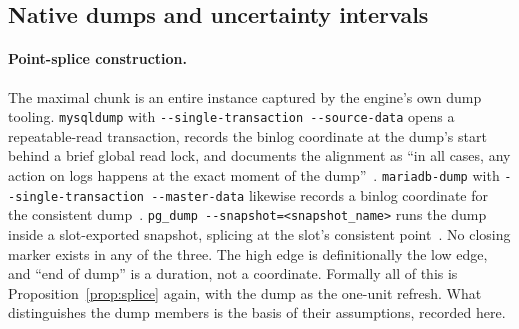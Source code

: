 \documentclass[sigconf,nonacm,10pt]{acmart}
\theoremstyle{plain}
\theoremstyle{definition}
\begin{document}
\subsection{Native dumps and uncertainty
intervals}\label{sec:inst-dump}

\begingroup
\RaggedRight
\paragraph{Point-splice construction.}
The maximal chunk is an entire instance captured by the engine's
own dump tooling. \texttt{mysqldump} with
\texttt{-{}-single-transaction -{}-source-data} opens a repeatable-read
transaction, records the binlog coordinate at the dump's start
behind a brief global read lock, and documents the alignment as
``in all cases, any action on logs happens at the exact moment of
the dump''~\cite{mysql_mysqldump}. \texttt{mariadb-dump} with
\texttt{-{}-single-transaction -{}-master-data} likewise records a
binlog coordinate for the consistent dump~\cite{mariadb_dump}. \texttt{pg\_dump -{}-snapshot=<snapshot\_name>} runs the
dump inside a slot-exported snapshot, splicing at the slot's
consistent point~\cite{postgres_pgdump,postgres_protocol_replication}. No closing marker exists
in any of the three. The high edge is definitionally the low edge,
and ``end of dump'' is a duration, not a coordinate. Formally all
of this is Proposition~\ref{prop:splice} again, with the dump as
the one-unit refresh. What distinguishes the dump members is the
basis of their assumptions, recorded here.
\par\endgroup
\end{document}
